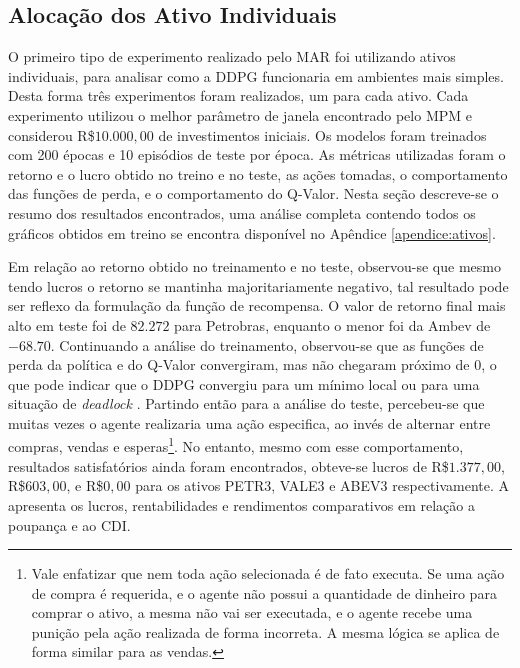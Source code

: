 \subsection{Alocação dos Ativo Individuais}

O primeiro tipo de experimento realizado pelo \acrshort{MAR} foi utilizando ativos individuais, para analisar como a \acrshort{DDPG} funcionaria em ambientes mais simples. Desta forma três experimentos foram realizados, um para cada ativo. Cada experimento utilizou o melhor parâmetro de janela encontrado pelo \acrshort{MPM} e considerou R\$$10.000,00$ de investimentos iniciais. Os modelos foram treinados com 200 épocas e 10 episódios de teste por época. As métricas utilizadas foram o retorno e o lucro obtido no treino e no teste, as ações tomadas, o comportamento das funções de perda, e o comportamento do Q-Valor. Nesta seção descreve-se o resumo dos resultados encontrados, uma análise completa contendo todos os gráficos obtidos em treino se encontra disponível no Apêndice \ref{apendice:ativos}.

Em relação ao retorno obtido no treinamento e no teste, observou-se que mesmo tendo lucros o retorno se mantinha majoritariamente negativo, tal resultado pode ser reflexo da formulação da função de recompensa. O valor de retorno final mais alto em teste foi de $82.272$ para Petrobras, enquanto o menor foi da Ambev de $-68.70$. Continuando a análise do treinamento, observou-se que as funções de perda da política e do Q-Valor convergiram, mas não chegaram próximo de 0, o que pode indicar que o \acrshort{DDPG} convergiu para um mínimo local ou para uma situação de \emph{deadlock} \cite{matheron2019problem}. Partindo então para a análise do teste, percebeu-se que muitas vezes o agente realizaria uma ação especifica, ao invés de alternar entre compras, vendas e esperas\footnote{Vale enfatizar que nem toda ação selecionada é de fato executa. Se uma ação de compra é requerida, e o agente não possui a quantidade de dinheiro para comprar o ativo, a mesma não vai ser executada, e o agente recebe uma punição pela ação realizada de forma incorreta. A mesma lógica se aplica de forma similar para as vendas.}. No entanto, mesmo com esse comportamento, resultados satisfatórios ainda foram encontrados, obteve-se lucros de R\$$1.377,00$, R\$$603,00$, e R\$$0,00$ para os ativos PETR3, VALE3 e ABEV3 respectivamente. A  apresenta os lucros, rentabilidades e rendimentos comparativos em relação a poupança e ao CDI.



